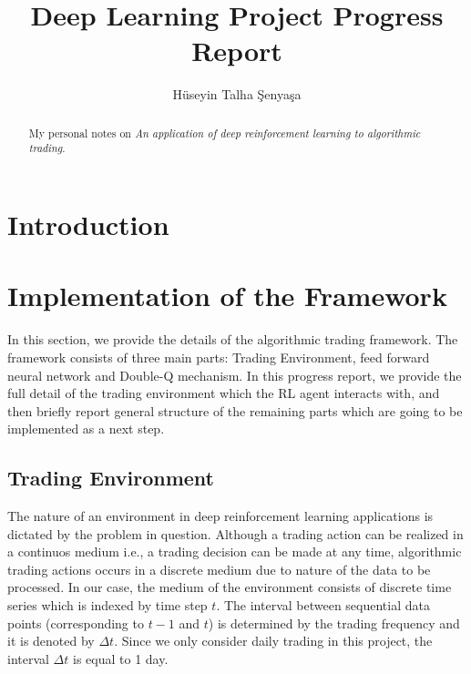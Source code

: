 \documentclass[twocolumn,aps,pra,superscriptaddress,nofootinbib,longbibliography]{revtex4-2}
\begin{document}
\title{Deep Learning Project Progress Report}

\author{H\"useyin Talha \c{S}enya\c{s}a}






\begin{abstract}
My personal notes on \textit{An application of deep reinforcement learning to algorithmic trading}.

\end{abstract}

\maketitle



\section{Introduction}

\section{Implementation of the Framework}

In this section, we provide the details of the algorithmic trading framework. The framework consists of three main parts: Trading Environment, feed forward neural network and Double-Q mechanism. In this progress report, we provide the full detail of the trading environment which the RL agent interacts with, and then briefly report general structure of the remaining parts which are going to be implemented as a next step. 
 

\subsection{Trading Environment}

The nature of an environment in deep reinforcement learning applications is dictated by the problem in question. Although a trading action can be realized in a continuos medium i.e., a trading decision can be made at any time, algorithmic trading actions occurs in a discrete medium due to nature of the data to be processed.  In our case, the medium of the environment consists of discrete time series which is indexed by time step \(t\). The interval between sequential data points (corresponding to \(t-1\) and \(t\)) is determined by the trading frequency and it is denoted by \(\Delta t\). Since we only consider daily trading in this project, the interval \(\Delta t\) is equal to 1 day. 
\end{document}
